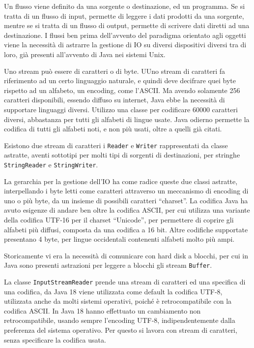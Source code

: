 \documentclass{article}
\numberwithin{equation}{subsection}
\begin{document}
Un flusso viene definito da una sorgente o destinazione, ed un programma. Se si tratta di un flusso di input, permette di leggere i dati prodotti da una sorgente, mentre se si tratta di un 
flusso di output, permette di scrivere dati diretti ad una destinazione. 
I flussi ben prima dell'avvento del paradigma orientato agli oggetti viene la necessità di astrarre la gestione di IO su diversi dispositivi diversi tra di loro, già presenti 
all'avvento di Java nei sistemi Unix. 

Uno stream può essere di caratteri o di byte. UUno stream di caratteri fa riferimento ad un certo linguaggio naturale, e quindi deve decifrare quei byte rispetto ad un alfabeto, 
un encoding, come l'ASCII. Ma avendo solamente 256 caratteri disponibili, essendo diffuso su internet, Java ebbe la necessità di supportare linguaggi diversi. Utilizzo una classe 
per codificare 60000 caratteri diversi, abbastanza per tutti gli alfabeti di lingue usate. Java odierno permette la codifica di tutti gli alfabeti noti, e non più usati, oltre 
a quelli già citati. 

Esistono due stream di caratteri i \verb|Reader| e \verb|Writer| rappresentati da classe astratte, aventi sottotipi per molti tipi di sorgenti di destinazioni, per stringhe 
\verb|StringReader| e \verb|StringWriter|. 

La gerarchia per la gestione dell'IO ha come radice queste due classi astratte, interpellando i byte letti come caratteri attraverso un meccanismo di encoding di uno o più byte, 
da un insieme di possibili caratteri ``charset''. 
La codifica Java ha avuto esigenze di andare ben oltre la codifica ASCII, per cui utilizza una variante della codifica UTF-16 per il charset ``Unicode'', per permettere di 
coprire gli alfabeti più diffusi, composta da una codifica a 16 bit. 
Altre codifiche supportate presentano 4 byte, per lingue occidentali contenenti alfabeti molto più ampi. 


Storicamente vi era la necessità di comunicare con hard disk a blocchi, per cui in Java sono presenti astrazioni per leggere a blocchi gli stream \verb|Buffer|. 

La classe \verb|InputStreamReader| prende una stream di caratteri ed una specifica di una codifica, da Java 18 viene utilizzata come default la codifica UTF-8, utilizzata 
anche da molti sistemi operativi, poiché è retrocompatibile con la codifica ASCII. In Java 18 hanno effettuato un cambiamento non retrocompatibile, usando sempre l'encoding 
UTF-8, indipendentemente dalla preferenza del sistema operativo. Per questo si lavora con stream di caratteri, senza specificare la codifica usata. 
\end{document}
